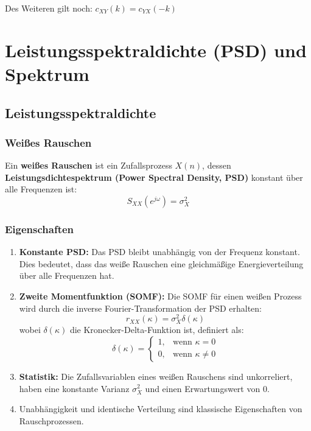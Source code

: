 \documentclass[12pt]{article}
\begin{document}
   Des Weiteren gilt noch: \(c_{XY}(k) = c_{YX}(-k)\)


\newpage

\section{Leistungsspektraldichte (PSD) und Spektrum}
\subsection{Leistungsspektraldichte}

   \subsubsection{Weißes Rauschen}

   Ein \textbf{weißes Rauschen} ist ein Zufallsprozess \(X(n)\), dessen \textbf{Leistungsdichtespektrum (Power Spectral Density, PSD)} konstant über alle Frequenzen ist:
   \[
   S_{XX}(e^{j\omega}) = \sigma_X^2
   \]

   \subsubsection*{Eigenschaften}
      \begin{enumerate}
         \item \textbf{Konstante PSD:} Das PSD bleibt unabhängig von der Frequenz konstant. Dies bedeutet, dass das weiße Rauschen eine gleichmäßige Energieverteilung über alle Frequenzen hat.
         \item \textbf{Zweite Momentfunktion (SOMF):} Die SOMF für einen weißen Prozess wird durch die inverse Fourier-Transformation der PSD erhalten:
         \[
            r_{XX}(\kappa) = \sigma_X^2 \delta(\kappa)
         \]
            wobei \(\delta(\kappa)\) die Kronecker-Delta-Funktion ist, definiert als:
         \[
         \delta(\kappa) = 
         \begin{cases} 
            1, & \text{wenn } \kappa = 0 \\
            0, & \text{wenn } \kappa \neq 0
         \end{cases}
         \]
            \item \textbf{Statistik:} Die Zufallsvariablen eines weißen Rauschens sind unkorreliert, haben eine konstante Varianz \(\sigma_X^2\) und einen Erwartungswert von 0.
         \item Unabhängigkeit und identische Verteilung sind klassische Eigenschaften von Rauschprozessen.
      \end{enumerate}
\end{document}
